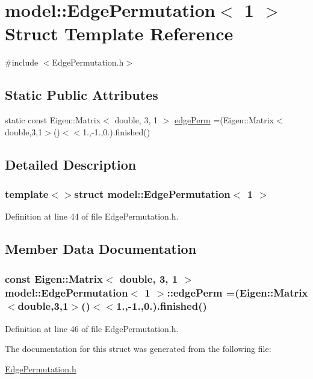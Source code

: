 \hypertarget{structmodel_1_1_edge_permutation_3_011_01_4}{}\section{model\+:\+:Edge\+Permutation$<$ 1 $>$ Struct Template Reference}
\label{structmodel_1_1_edge_permutation_3_011_01_4}


{\ttfamily \#include $<$Edge\+Permutation.\+h$>$}

\subsection*{Static Public Attributes}
\begin{DoxyCompactItemize}
\item 
static const Eigen\+::\+Matrix$<$ double, 3, 1 $>$ \hyperlink{structmodel_1_1_edge_permutation_3_011_01_4_aabd30bc608737a4f546897704fdee469}{edge\+Perm} =(Eigen\+::\+Matrix$<$double,3,1$>$()$<$$<$1.,-\/1.,0.).finished()
\end{DoxyCompactItemize}


\subsection{Detailed Description}
\subsubsection*{template$<$$>$struct model\+::\+Edge\+Permutation$<$ 1 $>$}



Definition at line 44 of file Edge\+Permutation.\+h.



\subsection{Member Data Documentation}
\hypertarget{structmodel_1_1_edge_permutation_3_011_01_4_aabd30bc608737a4f546897704fdee469}{}
\subsubsection[{edge\+Perm}]{\setlength{\rightskip}{0pt plus 5cm}const Eigen\+::\+Matrix$<$ double, 3, 1 $>$ {\bf model\+::\+Edge\+Permutation}$<$ 1 $>$\+::edge\+Perm =(Eigen\+::\+Matrix$<$double,3,1$>$()$<$$<$1.,-\/1.,0.).finished()\hspace{0.3cm}{\ttfamily [static]}}\label{structmodel_1_1_edge_permutation_3_011_01_4_aabd30bc608737a4f546897704fdee469}


Definition at line 46 of file Edge\+Permutation.\+h.



The documentation for this struct was generated from the following file\+:\begin{DoxyCompactItemize}
\item 
\hyperlink{_edge_permutation_8h}{Edge\+Permutation.\+h}\end{DoxyCompactItemize}
